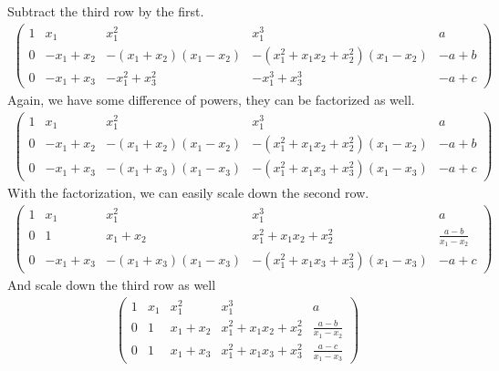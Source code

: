 Subtract the third row by the first.
\begin{eqnarray*}
\left(\begin{array}{rrrr|r}
1 & x_{1} & x_{1}^{2} & x_{1}^{3} & a \\
0 & -x_{1} + x_{2} & -{\left(x_{1} + x_{2}\right)} {\left(x_{1} - x_{2}\right)} & -{\left(x_{1}^{2} + x_{1} x_{2} + x_{2}^{2}\right)} {\left(x_{1} - x_{2}\right)} & -a + b \\
0 & -x_{1} + x_{3} & -x_{1}^{2} + x_{3}^{2} & -x_{1}^{3} + x_{3}^{3} & -a + c
\end{array}\right)
\end{eqnarray*}
Again, we have some difference of powers, they can be factorized as well.
\begin{eqnarray*}
\left(\begin{array}{rrrr|r}
1 & x_{1} & x_{1}^{2} & x_{1}^{3} & a \\
0 & -x_{1} + x_{2} & -{\left(x_{1} + x_{2}\right)} {\left(x_{1} - x_{2}\right)} & -{\left(x_{1}^{2} + x_{1} x_{2} + x_{2}^{2}\right)} {\left(x_{1} - x_{2}\right)} & -a + b \\
0 & -x_{1} + x_{3} & -{\left(x_{1} + x_{3}\right)} {\left(x_{1} - x_{3}\right)} & -{\left(x_{1}^{2} + x_{1} x_{3} + x_{3}^{2}\right)} {\left(x_{1} - x_{3}\right)} & -a + c
\end{array}\right)
\end{eqnarray*}
With the factorization, we can easily scale down the second row.
\begin{eqnarray*}
\left(\begin{array}{rrrr|r}
1 & x_{1} & x_{1}^{2} & x_{1}^{3} & a \\
0 & 1 & x_{1} + x_{2} & x_{1}^{2} + x_{1} x_{2} + x_{2}^{2} & \frac{a - b}{x_{1} - x_{2}} \\
0 & -x_{1} + x_{3} & -{\left(x_{1} + x_{3}\right)} {\left(x_{1} - x_{3}\right)} & -{\left(x_{1}^{2} + x_{1} x_{3} + x_{3}^{2}\right)} {\left(x_{1} - x_{3}\right)} & -a + c
\end{array}\right)
\end{eqnarray*}
And scale down the third row as well
\begin{eqnarray*}
\left(\begin{array}{rrrr|r}
1 & x_{1} & x_{1}^{2} & x_{1}^{3} & a \\
0 & 1 & x_{1} + x_{2} & x_{1}^{2} + x_{1} x_{2} + x_{2}^{2} & \frac{a - b}{x_{1} - x_{2}} \\
0 & 1 & x_{1} + x_{3} & x_{1}^{2} + x_{1} x_{3} + x_{3}^{2} & \frac{a - c}{x_{1} - x_{3}}
\end{array}\right)
\end{eqnarray*}
